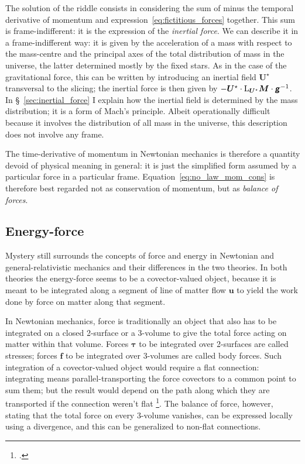 \documentclass[\ifafour a4paper,12pt,\else a5paper,10pt,\fi%
onecolumn,oneside,article,%
british%
]{memoir}
\theoremstyle{remark}
\theoremstyle{innote}
\newcommand*{\mathte}[1]{\textbf{\textit{\textsf{#1}}}}
\newcommand*{\citep}{\footcites}%
\renewcommand*{\|}{\nonscript\,\vert\nonscript\;\mathopen{}}
\newcommand*{\sect}{\S}%
\newcommand*{\Li}{\mathrm{L}}
\newcommand*{\yrr}{M}
\newcommand*{\yr}{\bm{\yrr}}
\newcommand*{\ycc}{u}
\newcommand*{\yc}{\bm{\ycc}}
\newcommand*{\yTT}{\tau}
\newcommand*{\yT}{\bm{\yTT}}
\newcommand*{\ybb}{f}
\newcommand*{\yb}{\bm{\ybb}}
\newcommand*{\yFF}{U}
\newcommand*{\yF}{\bm{\yFF}}
\newcommand*{\yFi}{\yF^{\mathord{\star}}}
\newcommand*{\ygg}{g}
\newcommand*{\yg}{\mathte{\ygg}}
\begin{document}
The solution of the riddle consists in considering the sum of minus the
temporal derivative of momentum and expression~\eqref{eq:fictitious_forces}
together. This sum is frame-indifferent: it is the expression of the
\emph{inertial force}. We can describe it in a frame-indifferent way: it is
given by the acceleration of a mass with respect to the mass-centre and the
principal axes of the total distribution of mass in the universe, the
latter determined mostly by the fixed stars. As in the case of the
gravitational force, this can be written by introducing an inertial field
$\yFi$ transversal to the slicing; the inertial force is then given by
$-\yFi \cdot \Li_{\yFi}\yr \cdot \yg^{-1}$. In
\sect~\ref{sec:inertial_force} I explain how the inertial field is
determined by the mass distribution; it is a form of Mach's principle.
Albeit operationally difficult because it involves the distribution of all
mass in the universe, this description does not involve any frame.

The time-derivative of momentum in Newtonian mechanics is therefore a
quantity devoid of physical meaning in general: it is just the simplified
form assumed by a particular force in a particular frame.
Equation~\eqref{eq:no_law_mom_cons} is therefore best regarded not as
conservation of momentum, but as \emph{balance of forces}.
\fi

\subsection{Energy-force}
\label{sec:force_balance_newton}

Mystery still surrounds the concepts of force and energy in Newtonian and
general-relativistic mechanics and their differences in the two theories.
In both theories the energy-force seems to be a covector-valued object,
because it is meant to be integrated along a segment of line of matter flow
$\yc$ to yield the work done by force on matter along that segment.

In Newtonian mechanics, force is traditionally an object that also has to
be integrated on a closed 2-surface or a 3-volume to give the total force
acting on matter within that volume. Forces $\yT$ to be integrated over
2-surfaces are called stresses; forces $\yb$ to be integrated over
3-volumes are called body forces. Such integration of a covector-valued
object would require a flat connection: integrating means
parallel-transporting the force covectors to a common point to sum them;
but the result would depend on the path along which they are transported if
the connection weren't flat \citep[\sect~238]{truesdelletal1960}. The
balance of force, however, stating that the total force on every 3-volume
vanishes, can be expressed locally using a divergence, and this can be
generalized to non-flat connections.
\end{document}
